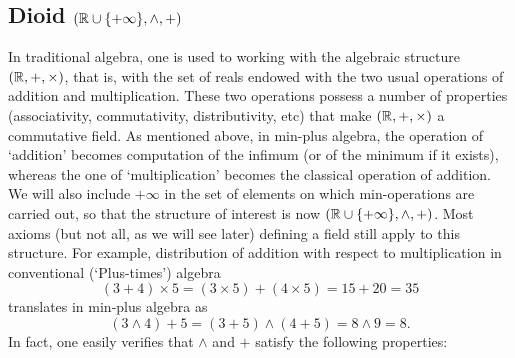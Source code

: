 \subsection{Dioid $( \mathbb{R} \cup \{ +\infty \}, \wedge, +)$}
In traditional algebra, one is used to working with the algebraic
structure $( \mathbb{R}, + , \times )$, that is, with the set of reals
endowed with the two usual operations of addition and
multiplication. These two operations possess a number of
properties (associativity, commutativity, distributivity, etc)
that make $( \mathbb{R}, + , \times )$ a commutative field. As
mentioned above, in min-plus algebra, the operation of `addition'
becomes computation of the infimum (or of the minimum if it
exists), whereas the one of `multiplication' becomes the classical
operation of addition. We will also include $ +\infty $ in the set
of elements on which min-operations are carried out, so that the
structure of interest is now  $(\mathbb{R} \cup  \{ +\infty \},
\wedge, +)$. Most axioms (but not all, as we will see later)
defining a field still apply to this structure. For example,
distribution of addition with respect to multiplication in
conventional (`Plus-times') algebra
$$ (3 + 4) \times 5  = (3 \times 5) + (4 \times 5) = 15 + 20 = 35 $$
%
%
translates in min-plus algebra as
$$ (3 \wedge 4) + 5  = (3 + 5) \wedge (4 + 5) = 8 \wedge 9 = 8. $$
In fact, one easily verifies that $\wedge$ and $+$ satisfy the following properties:
%
